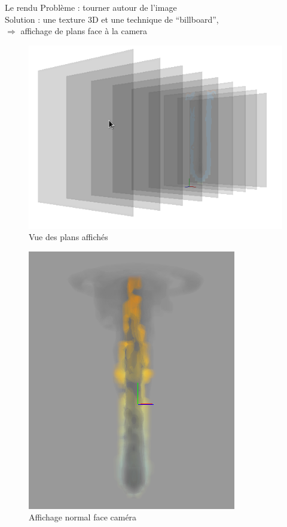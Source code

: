 \documentclass{beamer}
\begin{document}
\begin{frame}{Le rendu}
  Problème : tourner autour de l'image \\
  Solution : une texture 3D et une technique de ``billboard'',\\
             $\Rightarrow$ affichage de plans face à la camera \\
  \begin{minipage}{0.48\linewidth} 
    \begin{figure}[!h]
      \centering\includegraphics[scale=0.3]{Render3D.png}
      \caption{Vue des plans affichés}
      \label{PlanAffiche}
    \end{figure}
  \end{minipage}
  \begin{minipage}{0.48\linewidth}
    \begin{figure}[!h]
      \centering\includegraphics[scale=0.2]{Render3D3.png}
      \caption{Affichage normal face caméra}
      \label{VueFaceCam}
    \end{figure}
  \end{minipage}
\end{frame}
\end{document}
